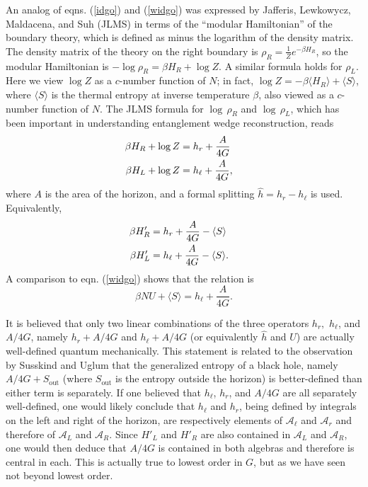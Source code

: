 \documentclass[11pt,a4paper]{article}
\def\out{{\mathrm{out}}}
\def\be{\begin{equation}}
\def\ee{\end{equation}}
\def\h{\widehat}
\def\A{{\mathcal A}}
\def\U{{ U}}
\def\h{\widehat}
\def\la{\langle}
\def\ra{\rangle}
\begin{document}
An analog of eqns. (\ref{idgo}) and (\ref{widgo}) was expressed by Jafferis, Lewkowycz, Maldacena, and Suh (JLMS) \cite{JLMS}
 in terms of the ``modular Hamiltonian'' of the boundary theory, which is defined
as minus the logarithm of the density matrix.
The density matrix of the theory on the right boundary is $\rho_R=\frac{1}{Z}e^{-\beta H_R}$, so the modular Hamiltonian is $-\log \rho_R=\beta H_R+\log Z$.   
A similar formula holds for $\rho_L$.  Here we view
$\log Z$ as a $c$-number function of $N$; in fact, $\log Z=-\beta\la H_R\ra+\la S\ra$, where $\la S\ra $ is the thermal entropy at inverse temperature $\beta$, 
also viewed as a $c$-number function of $N$.
The JLMS  formula for $\log\,\rho_R$ and $\log\,\rho_L$, which  has been important in understanding entanglement wedge reconstruction, reads 
 \begin{align}\label{oldone} \beta H_R+\log Z& = h_r +\frac{A}{4G}\cr
 \beta H_L +\log Z &= h_\ell +\frac{A}{4G}, \end{align}
 where $A$ is the area of the horizon, and a formal splitting $\h h=h_r-h_\ell$ is used.  
 Equivalently,
 \begin{align}\label{nago}\beta H_R'& = h_r +\frac{A}{4G}-\la S\ra \cr
                     \beta H_L'& =h_\ell +\frac{A}{4G}-\la S\ra .\end{align}
A comparison to eqn. (\ref{widgo}) shows that the relation is
\be\label{polin} \beta N \U+\la S\ra = h_\ell +\frac{A}{4G}.\ee

                    
 
It is believed that only two linear combinations of the three operators $h_r,$ $h_\ell$, and $A/4G$, namely $h_r+A/4G$ and $h_\ell+A/4G$ (or equivalently $\h h$
and $\U$) 
 are actually well-defined quantum mechanically.    This statement is related to the observation by Susskind and Uglum \cite{SU}
 that the generalized entropy of a black hole, namely
 $A/4G+S_\out$ (where $S_\out$ is the entropy outside the horizon) is better-defined than either term is separately.
 If one believed that $h_\ell$, $h_r$, and $A/4G$ are all separately well-defined, one would  likely conclude that $h_\ell$ and $h_r$, being defined
 by integrals on the left and right of the horizon, are respectively elements
 of $\A_\ell$ and $\A_r$ and therefore of $\A_L$ and $\A_R$.   Since $H'_L$ and $H'_R$  are also contained in $\A_L$ and $\A_R$, one would
 then deduce that $A/4G$ is contained in both algebras and therefore is central in each.   This is actually true to lowest order in $G$, but as we have seen
 not beyond lowest order.
 
\end{document}
